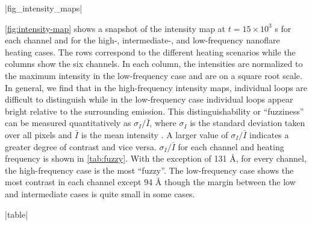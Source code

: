 |fig_intensity_maps|

\autoref{fig:intensity-map} shows a snapshot of the intensity map at $t=15\times10^3$ s for each channel and for the high-, intermediate-, and low-frequency nanoflare heating cases. The rows correspond to the different heating scenarios while the columns show the six channels. In each column, the intensities are normalized to the maximum intensity in the low-frequency case and are on a square root scale. In general, we find that in the high-frequency intensity maps, individual loops are difficult to distinguish while in the low-frequency case individual loops appear bright relative to the surrounding emission. This distinguishability or ``fuzziness'' can be measured quantitatively as $\sigma_{I}/\bar{I}$, where $\sigma_{I}$ is the standard deviation taken over all pixels and $\bar{I}$ is the mean intensity \citep[Equation 11]{guarrasi_coronal_2010-1}. A larger value of $\sigma_{I}/\bar{I}$ indicates a greater degree of contrast and vice versa. $\sigma_{I}/\bar{I}$ for each channel and heating frequency is shown in \autoref{tab:fuzzy}. With the exception of 131 \AA{}, for every channel, the high-frequency case is the most ``fuzzy''. The low-frequency case shows the most contrast in each channel except 94 \AA{} though the margin between the low and intermediate cases is quite small in some cases.

|table|

